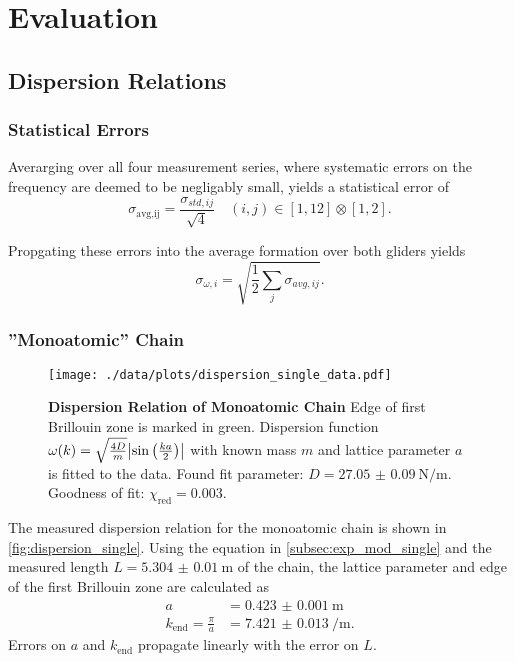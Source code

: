 \chapter{Evaluation}

\section{Dispersion Relations}\label{sec:disp_rels}
\subsection{Statistical Errors}
Averarging over all four measurement series, where systematic errors on the frequency are deemed to be negligably small, yields a statistical error of
\begin{equation*}
	\sigma_\text{avg,ij} = \frac{\sigma_{std,ij}}{\sqrt{4}}\quad (i,j)\in[1, 12]\otimes[1,2].
\end{equation*}

Propgating these errors into the average formation over both gliders yields
\begin{equation*}
	\sigma_{\omega,i} = \sqrt{\frac{1}{2}\sum_{j}\sigma_{avg,ij}}.
\end{equation*}

\subsection{''Monoatomic'' Chain}\label{subsec:disp_mono}
\begin{figure}
	\centering
	\texttt{[image: ./data/plots/dispersion\_single\_data.pdf]}
	\caption[Dispersion Relation of Monoatomic Chain]{\textbf{Dispersion Relation of Monoatomic Chain} Edge of first Brillouin zone is marked in green.
	Dispersion function $\omega(k) = \sqrt{\frac{4D}{m}}\abs{\sin\left(\frac{ka}{2}\right)}$ with known mass $m$ and lattice parameter $a$ is fitted to the data.
	Found fit parameter: $D=\SI{27.05(9)}{\newton\per\meter}$. Goodness of fit: $\chi_\text{red}=\num{0.003}$.}
	\label{fig:dispersion_single}
\end{figure}
The measured dispersion relation for the monoatomic chain is shown in \autoref{fig:dispersion_single}.
Using the equation in \autoref{subsec:exp_mod_single} and the measured length $L=\SI{5.304(10)}{\meter}$ of the chain, the lattice parameter and edge of the first Brillouin zone are calculated as
\begin{align*}
	a &= \SI{0.423(1)}{\meter} \\
	k_\text{end} = \frac{\pi}{a} &= \SI{7.421(13)}{\per\meter}.
\end{align*}
Errors on $a$ and $k_\text{end}$ propagate linearly with the error on $L$.

